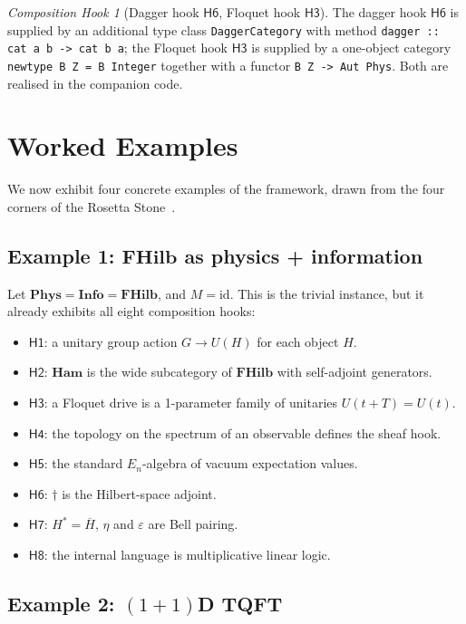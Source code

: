 \documentclass[12pt]{article}
\theoremstyle{definition}
\theoremstyle{remark}
\newtheorem{hook}[theorem]{Composition Hook}
\newcommand{\Phys}{\mathbf{Phys}}
\newcommand{\Info}{\mathbf{Info}}
\newcommand{\FHilb}{\mathbf{FHilb}}
\newcommand{\id}{\mathrm{id}}
\begin{document}
\begin{hook}[Dagger hook $\mathsf{H6}$, Floquet hook $\mathsf{H3}$]
The dagger hook $\mathsf{H6}$ is supplied by an additional type class \texttt{DaggerCategory} with method \texttt{dagger :: cat a b -> cat b a}; the Floquet hook $\mathsf{H3}$ is supplied by a one-object category \texttt{newtype B Z = B Integer} together with a functor \texttt{B Z -> Aut Phys}. Both are realised in the companion code.
\end{hook}

\section{Worked Examples}
\label{sec:examples}

We now exhibit four concrete examples of the framework, drawn from the four corners of the Rosetta Stone~\cite{baezstay2009}.

\subsection{Example 1: \texorpdfstring{$\FHilb$}{FHilb} as physics + information}

Let $\Phys = \Info = \FHilb$, and $M = \id$. This is the trivial instance, but it already exhibits all eight composition hooks:
\begin{itemize}
\item $\mathsf{H1}$: a unitary group action $G \to U(H)$ for each object $H$.
\item $\mathsf{H2}$: $\mathbf{Ham}$ is the wide subcategory of $\FHilb$ with self-adjoint generators.
\item $\mathsf{H3}$: a Floquet drive is a 1-parameter family of unitaries $U(t+T) = U(t)$.
\item $\mathsf{H4}$: the topology on the spectrum of an observable defines the sheaf hook.
\item $\mathsf{H5}$: the standard $E_n$-algebra of vacuum expectation values.
\item $\mathsf{H6}$: $\dagger$ is the Hilbert-space adjoint.
\item $\mathsf{H7}$: $H^* = \overline{H}$, $\eta$ and $\varepsilon$ are Bell pairing.
\item $\mathsf{H8}$: the internal language is multiplicative linear logic.
\end{itemize}

\subsection{Example 2: \texorpdfstring{$(1{+}1)$D}{(1+1)D} TQFT}
\end{document}
